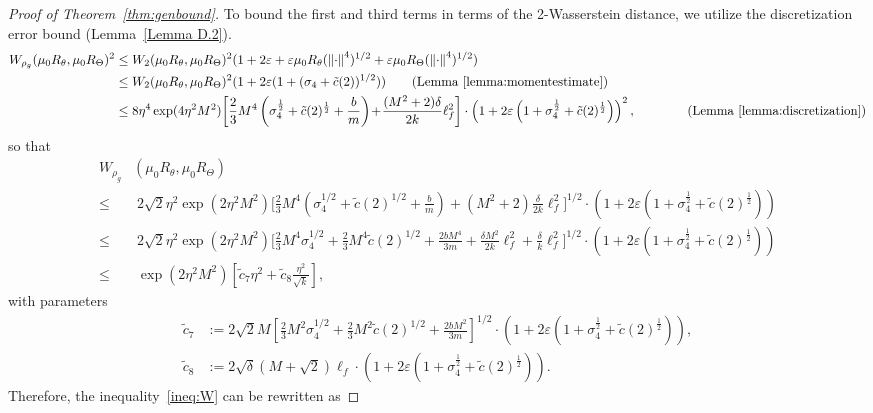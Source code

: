 \documentclass{article}
\newcommand{\norm}[1]{\left\lVert#1\right\rVert} %
\begin{document}
\begin{proof}[Proof of Theorem~\ref{thm:genbound}]
	To bound the first and third terms in terms of the 2-Wasserstein distance, we utilize the discretization error bound (Lemma~\ref{Lemma D.2}).
	\begin{align*}
		W_{\rho_g} (\mu_0 R_\theta, \mu_0 R_\Theta)^2 \leq&\; W_2 (\mu_0 R_\theta, \mu_0 R_\Theta)^2(1+2\varepsilon +\varepsilon \mu_0 R_\theta(\norm{\cdot}^4)^{1/2} +\varepsilon \mu_0 R_\Theta(\norm{\cdot}^4)^{1/2}) \\
		\leq&\; W_2 (\mu_0 R_\theta , \mu_0 R_\Theta)^2 (1+2\varepsilon (1+(\sigma_4 + \tilde{c}(2))^{1/2} )) \tag{Lemma~\ref{lemma:momentestimate}}\\
		\leq&\; 8\eta^4 \exp(4\eta^2 M^2) \bigg[\frac{2}{3} M^4 \left(\sigma_4^{\frac{1}{2}} + \tilde{c}(2)^{\frac{1}{2}} + \frac{b}{m}\right) \!+\! \frac{(M^2+ 2)\delta}{2k} \ell_f^2\bigg]  \cdot \left(1+2\varepsilon \left(1+\sigma_4^{\frac{1}{2}} + \tilde{c}(2)^{\frac{1}{2}}\right)\right)^2, \quad \quad \tag{Lemma~\ref{lemma:discretization}}
	\end{align*}
	so that
	\begin{align*}
		W_{\rho_g} &(\mu_0 R_\theta, \mu_0 R_\Theta)\\
		\leq&\; 2\sqrt{2} \eta^2 \exp(2\eta^2 M^2) \bigg[\frac{2}{3} M^4 (\sigma_4^{1/2} + \tilde{c}(2)^{1/2} + \frac{b}{m}) + ( M^2  + 2)\frac{\delta}{2k} \ell_f^2\bigg]^{1/2} \cdot \left(1+2\varepsilon \left(1+\sigma_4^{\frac{1}{2}} + \tilde{c}(2)^{\frac{1}{2}}\right)\right) \\
		\leq&\; 2\sqrt{2} \eta^2 \exp(2\eta^2 M^2 ) \bigg[\frac{2}{3}M^4 \sigma_4^{1/2} + \frac{2}{3}M^4 \tilde{c}(2)^{1/2} + \frac{2bM^4 }{ 3m} + \frac{\delta M^2}{ 2k}\ell_f^2 + \frac{\delta}{k} \ell_f^2\bigg]^{1/2} \cdot \left(1+2\varepsilon \left(1+\sigma_4^{\frac{1}{2}} + \tilde{c}(2)^{\frac{1}{2}}\right)\right) \\
		\leq&\; \exp(2\eta^2 M^2 ) \left[\tilde{c}_7  \eta^2+ \tilde{c}_8\frac{\eta^2}{\sqrt{k}}\right],
	\end{align*}
	with parameters
	\begin{align*}
		\tilde{c}_7& := 2\sqrt{2}  M\left[\frac{2}{3}M^2 \sigma_4^{1/2} +  \frac{2}{3}M^2 \tilde{c}(2)^{1/2}+ \frac{2bM^2}{3m}\right]^{1/2}\cdot \left(1+2\varepsilon \left(1+\sigma_4^{\frac{1}{2}} + \tilde{c}(2)^{\frac{1}{2}}\right)\right), \\
		\tilde{c}_8& := 2 \sqrt{\delta}\left(M  + \sqrt{2}  \right)\ell_f \cdot \left(1+2\varepsilon \left(1+\sigma_4^{\frac{1}{2}} + \tilde{c}(2)^{\frac{1}{2}}\right)\right).
	\end{align*}
	Therefore, the inequality~\eqref{ineq:W} can be rewritten as

\end{proof}
\end{document}

